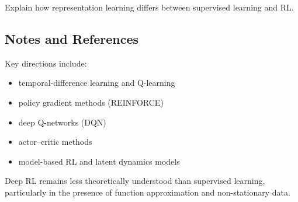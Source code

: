 \begin{exercise}
Explain how representation learning differs between supervised learning and RL.
\end{exercise}

\subsection{Notes and References}

Key directions include:
\begin{itemize}
\item temporal-difference learning and Q-learning
\item policy gradient methods (REINFORCE)
\item deep Q-networks (DQN)
\item actor--critic methods
\item model-based RL and latent dynamics models
\end{itemize}

Deep RL remains less theoretically understood than supervised learning, particularly in the presence of function approximation and non-stationary data.